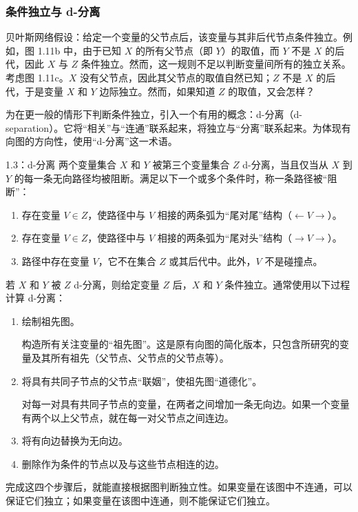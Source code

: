 
\FloatBarrier

\subsubsection{条件独立与 d-分离}

贝叶斯网络假设：给定一个变量的父节点后，该变量与其非后代节点条件独立。例如，图 1.11b 中，由于已知 $X$ 的所有父节点（即 $Y$）的取值，而 $Y$ 不是 $X$ 的后代，因此 $X$ 与 $Z$ 条件独立。然而，这一规则不足以判断变量间所有的独立关系。考虑图 1.11c。$X$ 没有父节点，因此其父节点的取值自然已知；$Z$ 不是 $X$ 的后代，于是变量 $X$ 和 $Y$ 边际独立。然而，如果知道 $Z$ 的取值，又会怎样？

为在更一般的情形下判断条件独立，引入一个有用的概念：d-分离（d-separation）。它将“相关”与“连通”联系起来，将独立与“分离”联系起来。为体现有向图的方向性，使用“d-分离”这一术语。

\begin{bookdefinition}{1.3：d-分离}
两个变量集合 $X$ 和 $Y$ 被第三个变量集合 $Z$ d-分离，当且仅当从 $X$ 到 $Y$ 的每一条无向路径均被阻断。满足以下一个或多个条件时，称一条路径被“阻断”：
\begin{enumerate}
\item 存在变量 $V\in Z$，使路径中与 $V$ 相接的两条弧为“尾对尾”结构（$\leftarrow V\to$）。
\item 存在变量 $V\in Z$，使路径中与 $V$ 相接的两条弧为“尾对头”结构（$\to V\to$）。
\item 路径中存在变量 $V$，它不在集合 $Z$ 或其后代中。此外，$V$ 不是碰撞点。
\end{enumerate}
若 $X$ 和 $Y$ 被 $Z$ d-分离，则给定变量 $Z$ 后，$X$ 和 $Y$ 条件独立。通常使用以下过程计算 d-分离：
\begin{enumerate}
\item 绘制祖先图。

构造所有关注变量的“祖先图”。这是原有向图的简化版本，只包含所研究的变量及其所有祖先（父节点、父节点的父节点等）。
\item 将具有共同子节点的父节点“联姻”，使祖先图“道德化”。

对每一对具有共同子节点的变量，在两者之间增加一条无向边。如果一个变量有两个以上父节点，就在每一对父节点之间连边。
\item 将有向边替换为无向边。
\item 删除作为条件的节点以及与这些节点相连的边。
\end{enumerate}
完成这四个步骤后，就能直接根据图判断独立性。如果变量在该图中不连通，可以保证它们独立；如果变量在该图中连通，则不能保证它们独立。
\end{bookdefinition}

